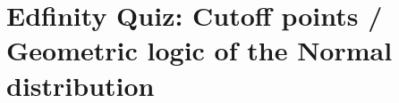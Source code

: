\documentclass[slidestop,compress,mathserif]{beamer}
\makeatletter
\def\chp4@path{../../Chp 4}
\makeatother
\begin{document}


\section{Edfinity Quiz: Cutoff points / Geometric logic of the Normal distribution}










\end{document}
